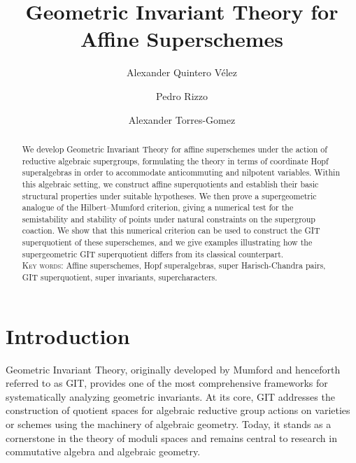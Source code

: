 \documentclass[11pt,a4paper,reqno,noamsfonts]{amsart}
\title{Geometric Invariant Theory for Affine Superschemes}
\author{Alexander Quintero V\'{e}lez}
\author{Pedro Rizzo}
\author{Alexander Torres-Gomez}
\numberwithin{equation}{section}
\theoremstyle{definition}
\theoremstyle{remark}
\begin{document}
\begin{abstract}
We develop Geometric Invariant Theory for affine superschemes under the action of reductive algebraic supergroups, formulating the theory in terms of coordinate Hopf superalgebras in order to accommodate anticommuting and nilpotent variables. Within this algebraic setting, we construct affine superquotients and establish their basic structural properties under suitable hypotheses. We then prove a supergeometric analogue of the Hilbert--Mumford criterion, giving a numerical test for the semistability and stability of points under natural constraints on the supergroup coaction. We show that this numerical criterion can be used to construct the GIT superquotient of these superschemes, and we give examples illustrating how the supergeometric GIT superquotient differs from its classical counterpart.\\

\noindent \textsc{Key words:} Affine superschemes, Hopf superalgebras, super Harisch-Chandra pairs, GIT superquotient, super invariants, supercharacters.
\end{abstract}




\maketitle

\section{Introduction}
Geometric Invariant Theory, originally developed by Mumford \cite{Mumford1961,Mumford1965} and henceforth referred to as GIT, provides one of the most comprehensive frameworks for systematically analyzing geometric invariants. At its core, GIT addresses the construction of quotient spaces for algebraic reductive group actions on varieties or schemes using the machinery of algebraic geometry. Today, it stands as a cornerstone in the theory of moduli spaces and remains central to research in commutative algebra and algebraic geometry.
\end{document}
